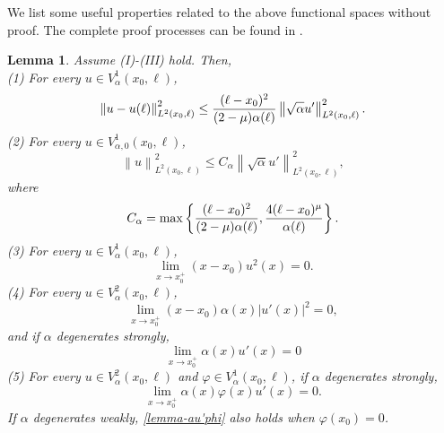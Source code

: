 \documentclass[twoside]{article}
\newtheorem{lemma}[definition]{Lemma}
\theoremstyle{noparens}
\theoremstyle{definition}
\newtheorem{remark}[definition]{Remark}
\numberwithin{equation}{section}
\numberwithin{figure}{section}
\begin{document}
We list some useful properties related to the above functional spaces without proof. The complete proof processes can be found in \cite{Alabau,Wang,Kogut}.
\begin{lemma}\label{lemma1}
	Assume (I)-(III) hold. Then, \\
	(1) For every $u\in V_{{\alpha}}^1(x_0,\ell)$,
	\begin{equation}\label{lemma3-2}
		\left\|u-u(\ell )\right\|_{L^2(x_0,\ell )}^2 \leq {(\ell - x_0)^2\over (2-\mu )\alpha(\ell )}
		\left\|\sqrt{\alpha}u'\right\|^2_{L^2(x_0 ,\ell )}.
	\end{equation}
	(2) For every $u\in V_{{\alpha},0}^1(x_0,\ell)$,
	\begin{equation}\label{lemma3-3}
		\left\|u\right\|_{L^2(x_0,\ell)}^2 \leq C_{\alpha} \left\|\sqrt{\alpha}u'\right\|_{L^2(x_0,\ell)}^2,
	\end{equation}
	where
	\begin{equation}
		C_{\alpha} = \max\left\{ {(\ell -x_0)^2\over (2-\mu )\alpha(\ell )},
		{4(\ell -x_0)^{\mu}\over {\alpha}(\ell )}\right\}.
	\end{equation}
	(3) For every $u\in V_{\alpha}^1(x_0,\ell)$,
	\begin{equation}\label{xu2}
		\lim_{x\rightarrow x_0^+} (x-x_0)u^2(x)
		=0.
	\end{equation}
(4) For every $u\in V_{\alpha}^2(x_0,\ell)$,
\begin{equation}\label{xau'2}
	\lim_{x\rightarrow x_0^+}(x - x_0){\alpha}(x)|u'(x)|^2
	=0,
\end{equation}
and if ${\alpha}$ degenerates strongly,
\begin{equation}\label{au'}
	\lim_{x\rightarrow x_0^+} {\alpha}(x)u'(x)
	= 0
\end{equation}
(5) For every $u\in V_{\alpha}^2(x_0,\ell)$ and $\varphi\in V_{\alpha}^1(x_0,\ell)$, if ${\alpha}$ degenerates strongly,
\begin{equation}\label{lemma-au'phi}
	\lim_{x\rightarrow x_0^+} {\alpha}(x)\varphi(x)u'(x)
	=0.
\end{equation}
If ${\alpha}$ degenerates weakly, \eqref{lemma-au'phi} also holds when $\varphi(x_0) = 0$.
\end{lemma}
\end{document}
